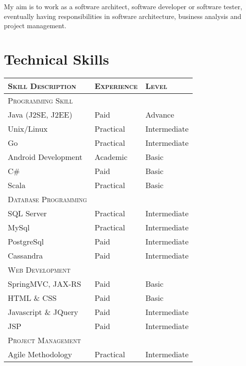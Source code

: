 \documentclass[a4paper,10pt]{article} %
\begin{document}
My aim is to work as a software architect, software developer or software tester, eventually having responsibilities in software architecture, business analysis and project management.


\section{Technical Skills}

    \begin{tabular}{l|l|l}
   
    \textsc{Skill Description} & \textsc{Experience}  & \textsc{Level} \\ \hline
    \textsc{Programming Skill}\\ \hline
    Java (J2SE, J2EE) & Paid & Advance \\
    Unix/Linux & Practical & Intermediate \\ 
    Go & Practical & Intermediate \\
    Android Development & Academic & Basic\\
    C\# & Paid & Basic \\ 
    Scala & Practical & Basic \\ \hline 
    \textsc{Database Programming} \\ \hline
    SQL Server & Practical & Intermediate \\ 
    MySql & Practical & Intermediate \\ 
    PostgreSql & Paid & Intermediate \\ 
    Cassandra & Paid & Intermediate \\ \hline
    \textsc{Web Development} \\ \hline
    SpringMVC, JAX-RS & Paid & Basic \\ 
    HTML \& CSS & Paid & Basic \\ 
    Javascript \& JQuery & Paid & Intermediate \\ 
    JSP & Paid & Intermediate \\ \hline
    \textsc{Project Management}\\ \hline
    Agile Methodology & Practical & Intermediate \\ 
    \end{tabular}
\end{document}
